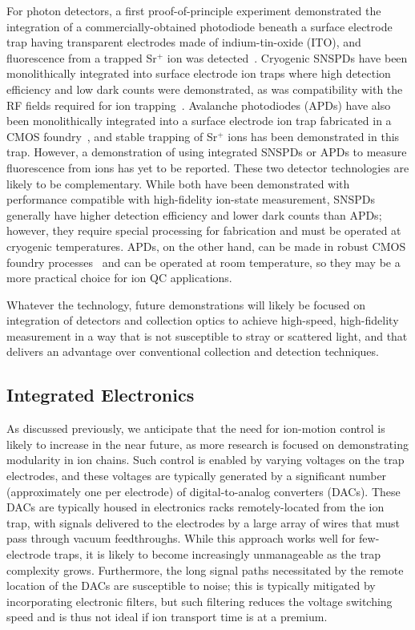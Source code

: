 \documentclass[%
reprint,
 amsmath,amssymb,
]{revtex4-1}
\begin{document}
For photon detectors, a first proof-of-principle experiment demonstrated the integration of a commercially-obtained photodiode beneath a surface electrode trap having transparent electrodes made of indium-tin-oxide (ITO), and fluorescence from a trapped Sr$^+$ ion was detected~\cite{EltonyITOTrap2013}. Cryogenic SNSPDs have been monolithically integrated into surface electrode ion traps where high detection efficiency and low dark counts were demonstrated, as was compatibility with the RF fields required for ion trapping~\cite{SlichterSNSPD2017}.  Avalanche photodiodes (APDs) have also been monolithically integrated into a surface electrode ion trap fabricated in a CMOS foundry~\cite{MehtaThesis2017}, and stable trapping of Sr$^+$ ions has been demonstrated in this trap.  However, a demonstration of using integrated SNSPDs or APDs to measure fluorescence from ions has yet to be reported.  These two detector technologies are likely to be complementary.  While both have been demonstrated with performance compatible with high-fidelity ion-state measurement, SNSPDs generally have higher detection efficiency and lower dark counts than APDs; however, they require special processing for fabrication and must be operated at cryogenic temperatures.  APDs, on the other hand, can be made in robust CMOS foundry processes~\cite{FieldAPD2010} and can be operated at room temperature, so they may be a more practical choice for ion QC applications.

Whatever the technology, future demonstrations will likely be focused on  integration of detectors and collection optics to achieve high-speed, high-fidelity measurement in a way that is not susceptible to stray or scattered light, and that delivers an advantage over conventional collection and detection techniques.

    \subsection{Integrated Electronics}
As discussed previously, we anticipate that the need for ion-motion control is likely to increase in the near future, as more research is focused on demonstrating modularity in ion chains.  Such control is enabled by varying voltages on the trap electrodes, and these voltages are typically generated by a significant number (approximately one per electrode) of digital-to-analog converters (DACs).  These DACs are typically housed in electronics racks remotely-located from the ion trap, with signals delivered to the electrodes by a large array of wires that must pass through vacuum feedthroughs.  While this approach works well for few-electrode traps, it is likely to become increasingly unmanageable as the trap complexity grows.  Furthermore, the long signal paths necessitated by the remote location of the DACs are susceptible to noise; this is typically mitigated by incorporating electronic filters, but such filtering reduces the voltage switching speed and is thus not ideal if ion transport time is at a premium.
\end{document}

